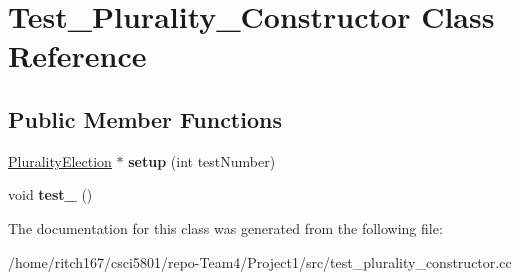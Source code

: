 \hypertarget{classTest__Plurality__Constructor}{}\section{Test\+\_\+\+Plurality\+\_\+\+Constructor Class Reference}
\label{classTest__Plurality__Constructor}
\subsection*{Public Member Functions}
\begin{DoxyCompactItemize}
\item 
\mbox{\label{classTest__Plurality__Constructor_aaa711bec35f272c0ab51b9ebf16e3937}} 
\hyperlink{classPluralityElection}{Plurality\+Election} $\ast$ {\bfseries setup} (int test\+Number)
\item 
\mbox{\label{classTest__Plurality__Constructor_a7eb1c3540b52d4f515a9968a43815ee2}} 
void {\bfseries test\+\_} ()
\end{DoxyCompactItemize}


The documentation for this class was generated from the following file\+:\begin{DoxyCompactItemize}
\item 
/home/ritch167/csci5801/repo-\/\+Team4/\+Project1/src/test\+\_\+plurality\+\_\+constructor.\+cc\end{DoxyCompactItemize}
